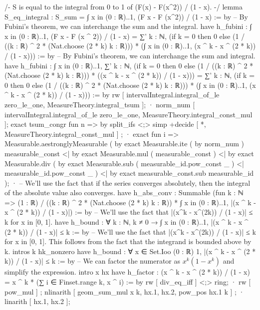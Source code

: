 /-
S is equal to the integral from 0 to 1 of (F(x) - F(x^2)) / (1 - x).
-/
lemma S_eq_integral : S_sum = ∫ x in (0 : ℝ)..1, (F x - F (x^2)) / (1 - x) := by
  -- By Fubini's theorem, we can interchange the sum and the integral.
  have h_fubini : ∫ x in (0 : ℝ)..1, (F x - F (x ^ 2)) / (1 - x) = ∑' k : ℕ, (if k = 0 then 0 else (1 / ((k : ℝ) ^ 2 * (Nat.choose (2 * k) k : ℝ))) * (∫ x in (0 : ℝ)..1, (x ^ k - x ^ (2 * k)) / (1 - x))) := by
    -- By Fubini's theorem, we can interchange the sum and integral.
    have h_fubini : ∫ x in (0 : ℝ)..1, ∑' k : ℕ, (if k = 0 then 0 else (1 / ((k : ℝ) ^ 2 * (Nat.choose (2 * k) k : ℝ))) * ((x ^ k - x ^ (2 * k)) / (1 - x))) = ∑' k : ℕ, (if k = 0 then 0 else (1 / ((k : ℝ) ^ 2 * (Nat.choose (2 * k) k : ℝ))) * (∫ x in (0 : ℝ)..1, (x ^ k - x ^ (2 * k)) / (1 - x))) := by
      rw [ intervalIntegral.integral_of_le zero_le_one, MeasureTheory.integral_tsum ];
      · norm_num [ intervalIntegral.integral_of_le zero_le_one, MeasureTheory.integral_const_mul ];
        exact tsum_congr fun n => by split_ifs <;> simp +decide [ *, MeasureTheory.integral_const_mul ] ;
      · exact fun i => Measurable.aestronglyMeasurable ( by exact Measurable.ite ( by norm_num ) measurable_const <| by exact Measurable.mul ( measurable_const ) <| by exact Measurable.div ( by exact Measurable.sub ( measurable_id.pow_const _ ) <| measurable_id.pow_const _ ) <| by exact measurable_const.sub measurable_id );
      · -- We'll use the fact that if the series converges absolutely, then the integral of the absolute value also converges.
        have h_abs_conv : Summable (fun k : ℕ => (1 : ℝ) / ((k : ℝ) ^ 2 * (Nat.choose (2 * k) k : ℝ)) * ∫ x in (0 : ℝ)..1, |(x ^ k - x ^ (2 * k)) / (1 - x)|) := by
          -- We'll use the fact that |(x^k - x^(2k)) / (1 - x)| ≤ k for x in [0, 1].
          have h_bound : ∀ k : ℕ, k ≠ 0 → ∫ x in (0 : ℝ)..1, |(x ^ k - x ^ (2 * k)) / (1 - x)| ≤ k := by
            -- We'll use the fact that |(x^k - x^(2k)) / (1 - x)| ≤ k for x in [0, 1]. This follows from the fact that the integrand is bounded above by k.
            intros k hk_nonzero
            have h_bound : ∀ x ∈ Set.Ioo (0 : ℝ) 1, |(x ^ k - x ^ (2 * k)) / (1 - x)| ≤ k := by
              -- We can factor the numerator as $x^k(1 - x^k)$ and simplify the expression.
              intro x hx
              have h_factor : (x ^ k - x ^ (2 * k)) / (1 - x) = x ^ k * (∑ i ∈ Finset.range k, x ^ i) := by
                rw [ div_eq_iff ] <;> ring;
                · rw [ pow_mul ] ; nlinarith [ geom_sum_mul x k, hx.1, hx.2, pow_pos hx.1 k ] ;
                · linarith [ hx.1, hx.2 ];
